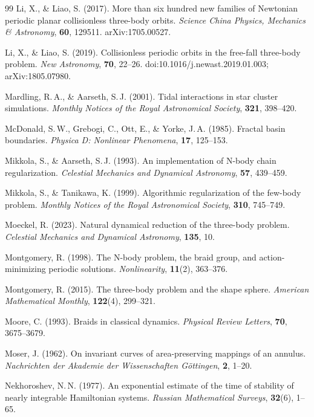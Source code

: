 \documentclass[11pt,a4paper]{article}
\begin{document}
\begin{thebibliography}{99}
Li, X., \& Liao, S. (2017).
More than six hundred new families of Newtonian periodic planar collisionless three-body orbits.
\textit{Science China Physics, Mechanics \& Astronomy}, \textbf{60}, 129511.
arXiv:1705.00527.

Li, X., \& Liao, S. (2019).
Collisionless periodic orbits in the free-fall three-body problem.
\textit{New Astronomy}, \textbf{70}, 22--26.
doi:10.1016/j.newast.2019.01.003; arXiv:1805.07980.

Mardling, R.\,A., \& Aarseth, S.\,J. (2001).
Tidal interactions in star cluster simulations.
\textit{Monthly Notices of the Royal Astronomical Society}, \textbf{321}, 398--420.

McDonald, S.\,W., Grebogi, C., Ott, E., \& Yorke, J.\,A. (1985).
Fractal basin boundaries.
\textit{Physica D: Nonlinear Phenomena}, \textbf{17}, 125--153.

Mikkola, S., \& Aarseth, S.\,J. (1993).
An implementation of N-body chain regularization.
\textit{Celestial Mechanics and Dynamical Astronomy}, \textbf{57}, 439--459.

Mikkola, S., \& Tanikawa, K. (1999).
Algorithmic regularization of the few-body problem.
\textit{Monthly Notices of the Royal Astronomical Society}, \textbf{310}, 745--749.

Moeckel, R. (2023).
Natural dynamical reduction of the three-body problem.
\textit{Celestial Mechanics and Dynamical Astronomy}, \textbf{135}, 10.

Montgomery, R. (1998).
The N-body problem, the braid group, and action-minimizing periodic solutions.
\textit{Nonlinearity}, \textbf{11}(2), 363--376.

Montgomery, R. (2015).
The three-body problem and the shape sphere.
\textit{American Mathematical Monthly}, \textbf{122}(4), 299--321.

Moore, C. (1993).
Braids in classical dynamics.
\textit{Physical Review Letters}, \textbf{70}, 3675--3679.

Moser, J. (1962).
On invariant curves of area-preserving mappings of an annulus.
\textit{Nachrichten der Akademie der Wissenschaften G\"{o}ttingen}, \textbf{2}, 1--20.

Nekhoroshev, N.\,N. (1977).
An exponential estimate of the time of stability of nearly integrable Hamiltonian systems.
\textit{Russian Mathematical Surveys}, \textbf{32}(6), 1--65.


\end{thebibliography}
\end{document}
